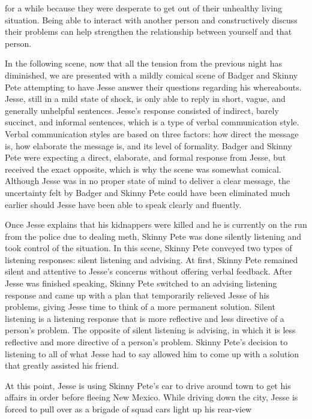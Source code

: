 \documentclass[12pt]{article}
\begin{document}
for a while because they were desperate to get out of their unhealthy living
situation. Being able to interact with another person and constructively discuss
their problems can help strengthen the relationship between yourself and that
person.
\par
In the following scene, now that all the tension from the previous night has
diminished, we are presented with a mildly comical scene of Badger and Skinny
Pete attempting to have Jesse answer their questions regarding his whereabouts.
Jesse, still in a mild state of shock, is only able to reply in short, vague, and
generally unhelpful sentences. Jesse’s response consisted of indirect, barely
succinct, and informal sentences, which is a type of verbal communication style.
Verbal communication styles are based on three factors: how direct the message
is, how elaborate the message is, and its level of formality. Badger and Skinny
Pete were expecting a direct, elaborate, and formal response from Jesse, but
received the exact opposite, which is why the scene was somewhat comical.
Although Jesse was in no proper state of mind to deliver a clear message, the
uncertainty felt by Badger and Skinny Pete could have been eliminated much
earlier should Jesse have been able to speak clearly and fluently.
\par
Once Jesse explains that his kidnappers were killed and he is currently on the
run from the police due to dealing meth, Skinny Pete was done silently listening
and took control of the situation. In this scene, Skinny Pete conveyed two
types of listening responses: silent listening and advising. At first, Skinny Pete
remained silent and attentive to Jesse’s concerns without offering verbal feedback.
After Jesse was finished speaking, Skinny Pete switched to an advising listening
response and came up with a plan that temporarily relieved Jesse of his problems,
giving Jesse time to think of a more permanent solution. Silent listening is a
listening response that is more reflective and less directive of a person’s problem.
The opposite of silent listening is advising, in which it is less reflective and more
directive of a person’s problem. Skinny Pete’s decision to listening to all of what
Jesse had to say allowed him to come up with a solution that greatly assisted
his friend.
\par
At this point, Jesse is using Skinny Pete’s car to drive around town to get
his affairs in order before fleeing New Mexico. While driving down the city,
Jesse is forced to pull over as a brigade of squad cars light up his rear-view
\end{document}
